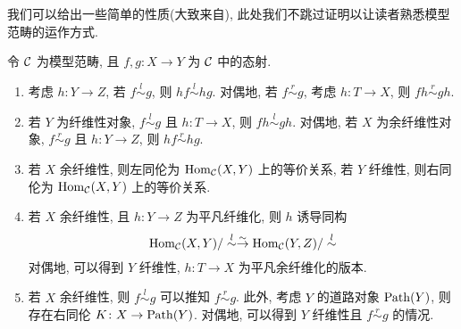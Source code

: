 我们可以给出一些简单的性质(大致来自\cite[Lemma 1.1.1.-1.1.5.]{quillen2006homotopical}), 此处我们不跳过证明以让读者熟悉模型范畴的运作方式.
\begin{proposition}\label{命题:模型范畴上同伦的简单性质}
    令 $\cal{C}$ 为模型范畴, 且 $f,g \colon X \to Y$ 为 $\cal{C}$ 中的态射.
    \begin{enumerate}
        \item 考虑 $h \colon Y \to Z$, 若 $f\overset{l}{\sim} g$, 则 $hf\overset{l}{\sim} hg$. 对偶地, 若 $f\overset{r}{\sim} g$, 考虑 $h\colon T \to X$, 则 $fh\overset{r}{\sim} gh$.
        \item 若 $Y$ 为纤维性对象, $f\overset{l}{\sim} g$ 且 $h \colon T \to X$, 则 $fh \overset{l}{\sim} gh$. 对偶地, 若 $X$ 为余纤维性对象, $f\overset{r}{\sim}g$ 且 $h \colon Y \to Z$, 则 $hf\overset{r}{\sim}hg$.
        \item 若 $X$ 余纤维性, 则左同伦为 $\operatorname{Hom}_{\cal{C}}(X,Y)$ 上的等价关系, 若 $Y$ 纤维性, 则右同伦为 $\operatorname{Hom}_{\cal{C}}(X,Y)$ 上的等价关系.
        \item 若 $X$ 余纤维性, 且 $h \colon Y \to Z$ 为平凡纤维化, 则 $h$ 诱导同构
        \[
        \operatorname{Hom}_{\cal{C}}(X,Y)/\overset{l}{\sim} \stackrel{\sim}{\rightarrow} \operatorname{Hom}_{\cal{C}}(Y,Z)/\overset{l}{\sim}
        \]
        对偶地, 可以得到 $Y$ 纤维性, $h \colon T \to X$ 为平凡余纤维化的版本.
        \item 若 $X$ 余纤维性, 则 $f\overset{l}{\sim} g$ 可以推知 $f\overset{r}{\sim} g$. 此外, 考虑 $Y$ 的道路对象 $\operatorname{Path}(Y)$, 则存在右同伦 $K \colon X \to \operatorname{Path}(Y)$. 对偶地, 可以得到 $Y$ 纤维性且 $f \overset{r}{\sim} g$ 的情况.
    \end{enumerate}
\end{proposition}
